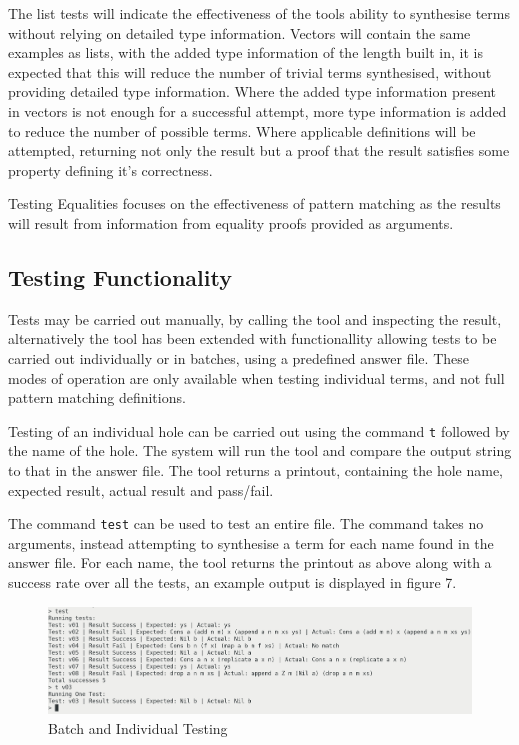 \documentclass[a4paper]{article}
\begin{document}
The list tests will indicate the effectiveness of the
tools ability to synthesise terms without relying on detailed
type information. Vectors will contain the same examples as lists,
with the added type information of the length built in, it is expected that
this will reduce the number of trivial terms synthesised, without providing
detailed type information. Where the added type information present in
vectors is not enough for a successful attempt, more type information is added
to reduce the number of possible terms. Where applicable definitions will be
attempted, returning not only the result but a proof that the result satisfies
some property defining it's correctness. 

Testing Equalities focuses on the effectiveness of pattern matching
as the results will result from information from equality proofs provided
as arguments. 


\subsection{Testing Functionality}

Tests may be carried out manually, by calling the tool and inspecting the
result, alternatively the tool has been extended with functionallity
allowing tests to be carried out individually or in batches, using a
predefined answer file. These modes of operation are only available
when testing individual terms, and not full pattern matching definitions.

Testing of an individual hole can be carried out using the 
command \texttt{t} followed by the name of the hole. The system
will run the tool and compare the output string to that in the answer file.
The tool returns a printout, containing the hole name, expected result,
actual result and pass/fail.


The command \texttt{test} can be used to test an entire file. The command takes no arguments,
instead attempting to synthesise a term for each name found in the answer file. 
For each name, the tool returns the printout as above along with a success rate over all
the tests, an example output is displayed in figure 7.

\begin{center}
\begin{figure}[htbp]
\centering
\includegraphics[scale=0.20]{./Resource/batch-test.png}
\caption{Batch and Individual Testing}
\end{figure}
\end{center}
\end{document}
